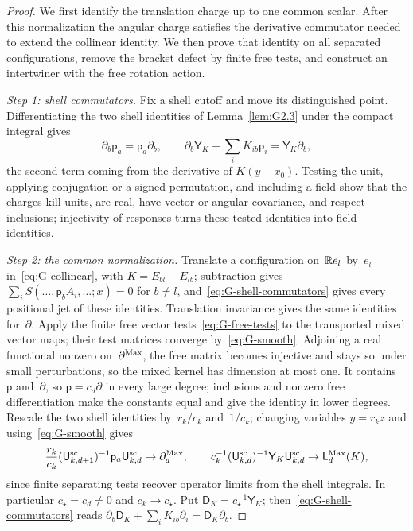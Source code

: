 \begin{proof}
We first identify the translation charge up to one common scalar. After this normalization the angular charge satisfies the derivative commutator needed to extend the collinear identity. We then prove that identity on all separated configurations, remove the bracket defect by finite free tests, and construct an intertwiner with the free rotation action.

\emph{Step 1: shell commutators.} Fix a shell cutoff and move its distinguished point. Differentiating the two shell identities of Lemma~\ref{lem:G2.3} under the compact integral gives
\begin{equation}\label{eq:G-shell-commutators}
\partial_b\mathsf p_a=\mathsf p_a\partial_b,\qquad
\partial_b\mathsf Y_K+\sum_iK_{ib}\mathsf p_i
 =\mathsf Y_K\partial_b,
\end{equation}
the second term coming from the derivative of $K(y-x_0)$. Testing the unit, applying conjugation or a signed permutation, and including a field show that the charges kill units, are real, have vector or angular covariance, and respect inclusions; injectivity of responses turns these tested identities into field identities.

\emph{Step 2: the common normalization.} Translate a configuration on~$\mathbb{R} e_l$ by~$e_l$ in~\eqref{eq:G-collinear}, with $K=E_{bl}-E_{lb}$; subtraction gives $\sum_iS(\ldots,\mathsf p_bA_i,\ldots;x)=0$ for $b\ne l$, and~\eqref{eq:G-shell-commutators} gives every positional jet of these identities. Translation invariance gives the same identities for~$\partial$. Apply the finite free vector tests~\eqref{eq:G-free-tests} to the transported mixed vector maps; their test matrices converge by~\eqref{eq:G-smooth}. Adjoining a real functional nonzero on~$\partial^{\rm Max}$, the free matrix becomes injective and stays so under small perturbations, so the mixed kernel has dimension at most one. It contains~$\mathsf p$ and~$\partial$, so $\mathsf p=c_d\partial$ in every large degree; inclusions and nonzero free differentiation make the constants equal and give the identity in lower degrees. Rescale the two shell identities by~$r_k/c_k$ and~$1/c_k$; changing variables $y=r_kz$ and using~\eqref{eq:G-smooth} gives
\begin{equation}\label{eq:G-charge-limits}
\frac{r_k}{c_k}(\mathsf{U}_{k,d+1}^{\mathrm{sc}})^{-1}\mathsf p_a\mathsf{U}_{k,d}^{\mathrm{sc}}
 \to\partial_a^{\rm Max},\qquad
c_k^{-1}(\mathsf{U}_{k,d}^{\mathrm{sc}})^{-1}\mathsf Y_K\mathsf{U}_{k,d}^{\mathrm{sc}}
 \to\mathsf L_d^{\rm Max}(K),
\end{equation}
since finite separating tests recover operator limits from the shell integrals. In particular $c_\star=c_d\ne0$ and $c_k\to c_\star$. Put $\mathsf D_K=c_\star^{-1}\mathsf Y_K$; then~\eqref{eq:G-shell-commutators} reads $\partial_b\mathsf D_K+\sum_iK_{ib}\partial_i=\mathsf D_K\partial_b$.


\end{proof}
